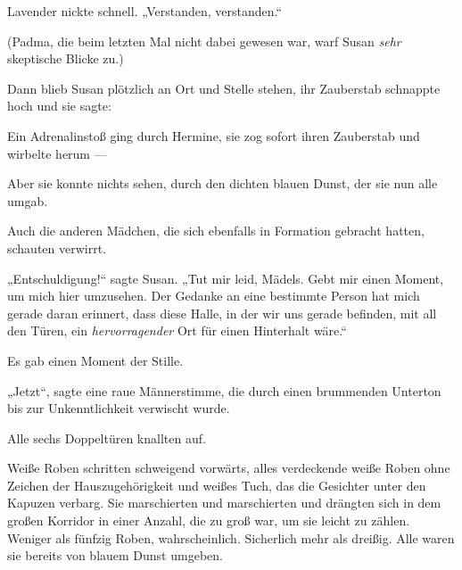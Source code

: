 Lavender nickte schnell.
„Verstanden, verstanden.“

(Padma, die beim letzten Mal nicht dabei gewesen war, warf Susan \emph{sehr} skeptische Blicke zu.)

Dann blieb Susan plötzlich an Ort und Stelle stehen, ihr Zauberstab schnappte hoch und sie sagte: 

Ein Adrenalinstoß ging durch Hermine, sie zog sofort ihren Zauberstab und wirbelte herum —

Aber sie konnte nichts sehen, durch den dichten blauen Dunst, der sie nun alle umgab.

Auch die anderen Mädchen, die sich ebenfalls in Formation gebracht hatten, schauten verwirrt.

„Entschuldigung!“ sagte Susan.
„Tut mir leid, Mädels. Gebt mir einen Moment, um mich hier umzusehen. Der Gedanke an eine bestimmte Person hat mich gerade daran erinnert, dass diese Halle, in der wir uns gerade befinden, mit all den Türen, ein \emph{hervorragender} Ort für einen Hinterhalt wäre.“

Es gab einen Moment der Stille.

„Jetzt“, sagte eine raue Männerstimme, die durch einen brummenden Unterton bis zur Unkenntlichkeit verwischt wurde.

Alle sechs Doppeltüren knallten auf.

Weiße Roben schritten schweigend vorwärts, alles verdeckende weiße Roben ohne Zeichen der Hauszugehörigkeit und weißes Tuch, das die Gesichter unter den Kapuzen verbarg. Sie marschierten und marschierten und drängten sich in dem großen Korridor in einer Anzahl, die zu groß war, um sie leicht zu zählen. Weniger als fünfzig Roben, wahrscheinlich. Sicherlich mehr als dreißig. Alle waren sie bereits von blauem Dunst umgeben.

